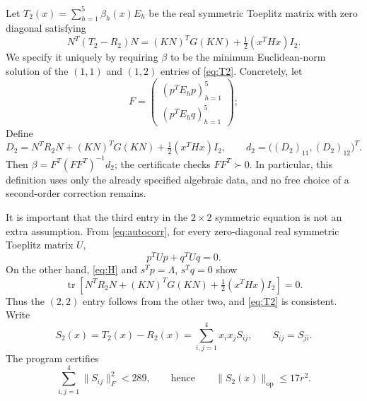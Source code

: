 \documentclass[11pt]{article}
\newcommand{\tr}{\operatorname{tr}}
\newcommand{\Op}{\mathrm{op}}
\begin{document}
Let $T_2(x)=\sum_{h=1}^5\beta_h(x)E_h$ be the real symmetric Toeplitz matrix with zero diagonal satisfying
\begin{equation}\label{eq:T2}
 N^T(T_2-R_2)N=(KN)^TG(KN)+\tfrac12(x^THx)I_2.
\end{equation}
We specify it uniquely by requiring $\beta$ to be the minimum Euclidean-norm solution of the $(1,1)$ and $(1,2)$ entries of \eqref{eq:T2}. Concretely, let
\begin{equation}\label{eq:F}
 F=\begin{pmatrix}(p^TE_hp)_{h=1}^5\\(p^TE_hq)_{h=1}^5\end{pmatrix};
\end{equation}
Define
\[
 D_2=N^TR_2N+(KN)^TG(KN)+\tfrac12(x^THx)I_2,
 \qquad d_2=\bigl((D_2)_{11},(D_2)_{12}\bigr)^T.
\]
Then $\beta=F^T(FF^T)^{-1}d_2$; the certificate checks
$FF^T\succ0$. In particular, this definition uses only the already
specified algebraic data, and no free choice of a second-order correction
remains.

It is important that the third entry in the $2\times2$ symmetric equation is not an extra assumption. From \eqref{eq:autocorr}, for every zero-diagonal real symmetric Toeplitz matrix $U$,
\begin{equation}\label{eq:trace-zero}
 p^TUp+q^TUq=0.
\end{equation}
On the other hand, \eqref{eq:H} and $s^Tp=\Lambda$, $s^Tq=0$ show
\begin{equation}\label{eq:trace-compat}
 \tr\left[N^TR_2N+(KN)^TG(KN)+\tfrac12(x^THx)I_2\right]=0.
\end{equation}
Thus the $(2,2)$ entry follows from the other two, and \eqref{eq:T2} is consistent. Write
\begin{equation}\label{eq:S2}
 S_2(x)=T_2(x)-R_2(x)=\sum_{i,j=1}^4x_ix_jS_{ij},\qquad S_{ij}=S_{ji}.
\end{equation}
The program certifies
\begin{equation}\label{eq:S2-bound}
 \sum_{i,j=1}^4\|S_{ij}\|_F^2<289,
 \qquad\text{hence}\qquad\|S_2(x)\|_\Op\le17r^2.
\end{equation}
\end{document}
